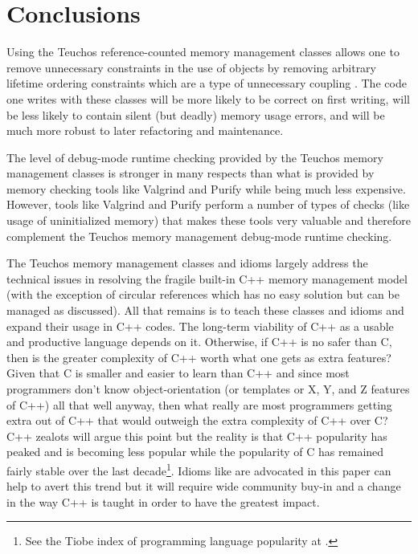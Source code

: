 \documentclass[pdf,ps2pdf,11pt]{SANDreport}
\begin{document}
%
{}\section{Conclusions}
\label{sec:conclusions}
%

Using the Teuchos reference-counted memory management classes allows
one to remove unnecessary constraints in the use of objects by
removing arbitrary lifetime ordering constraints which are a type of
unnecessary coupling {}\cite{CodeComplete2nd04}.  The code one writes
with these classes will be more likely to be correct on first writing,
will be less likely to contain silent (but deadly) memory usage
errors, and will be much more robust to later refactoring and
maintenance.

The level of debug-mode runtime checking provided by the Teuchos
memory management classes is stronger in many respects than what is
provided by memory checking tools like Valgrind and Purify while being
much less expensive.  However, tools like Valgrind and Purify perform
a number of types of checks (like usage of uninitialized memory) that
makes these tools very valuable and therefore complement the Teuchos
memory management debug-mode runtime checking.

The Teuchos memory management classes and idioms largely address the
technical issues in resolving the fragile built-in C++ memory
management model (with the exception of circular references which has
no easy solution but can be managed as discussed).  All that remains
is to teach these classes and idioms and expand their usage in C++
codes.  The long-term viability of C++ as a usable and productive
language depends on it.  Otherwise, if C++ is no safer than C, then is
the greater complexity of C++ worth what one gets as extra features?
Given that C is smaller and easier to learn than C++ and since most
programmers don't know object-orientation (or templates or X, Y, and Z
features of C++) all that well anyway, then what really are most
programmers getting extra out of C++ that would outweigh the extra
complexity of C++ over C?  C++ zealots will argue this point but the
reality is that C++ popularity has peaked and is becoming less popular
while the popularity of C has remained fairly stable over the last
decade\footnote{See the Tiobe index of programming language popularity
at {}.}.  Idioms like are advocated in this
paper can help to avert this trend but it will require wide community
buy-in and a change in the way C++ is taught in order to have the
greatest impact.
\end{document}
